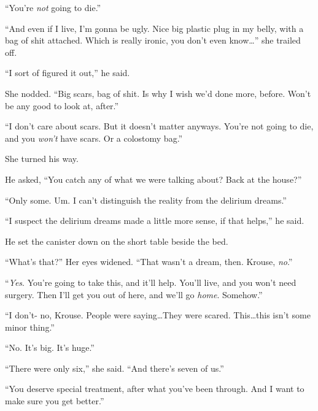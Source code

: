 ``You're \emph{not} going to die.''



``And even if I live, I'm gonna be ugly.  Nice big plastic plug in my belly, with a bag of shit attached.  Which is really ironic, you don't even know\ldots'' she trailed off.



``I sort of figured it out,'' he said.



She nodded.  ``Big scars, bag of shit.  Is why I wish we'd done more, before.  Won't be any good to look at, after.''



``I don't care about scars.  But it doesn't matter anyways.  You're not going to die, and you \emph{won't} have scars.  Or a colostomy bag.''



She turned his way.



He asked, ``You catch any of what we were talking about?  Back at the house?''



``Only some.  Um.  I can't distinguish the reality from the delirium dreams.''



``I suspect the delirium dreams made a little more sense, if that helps,'' he said.



He set the canister down on the short table beside the bed.



``What's that?''  Her eyes widened.  ``That wasn't a dream, then.  Krouse, \emph{no}.''



``\emph{Yes}.  You're going to take this, and it'll help.  You'll live, and you won't need surgery.  Then I'll get you out of here, and we'll go \emph{home}.  Somehow.''



``I don't- no, Krouse.  People were saying\ldots  They were scared.  This\ldots this isn't some minor thing.''



``No.  It's big.  It's huge.''



``There were only six,'' she said.  ``And there's seven of us.''



``You deserve special treatment, after what you've been through.  And I want to make sure you get better.''



